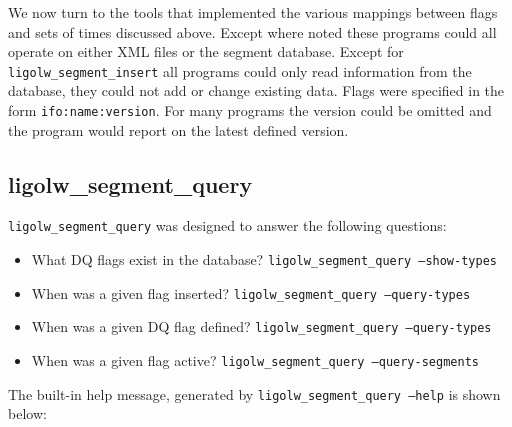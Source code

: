We now turn to the tools that implemented the various mappings between
flags and sets of times discussed above.  Except where noted these
programs could all operate on either XML files or the segment
database.  Except for \texttt{ligolw\_segment\_insert} all programs
could only read information from the database, they could not add or
change existing data.  Flags were specified in the form
\texttt{ifo:name:version}.  For many programs the version could be
omitted and the program would report on the latest defined version.

\subsection{ligolw\_segment\_query}

\texttt{ligolw\_segment\_query} was designed to answer the following
questions:
%
\begin{itemize}
\item What DQ flags exist in the database?
\texttt{ligolw\_segment\_query --show-types}
\item When was a given flag inserted? \texttt{ligolw\_segment\_query
--query-types}
\item When was a given DQ flag defined? \texttt{ligolw\_segment\_query
--query-types}
\item When was a given flag active? \texttt{ligolw\_segment\_query
--query-segments}
\end{itemize}
%
The built-in help message, generated by \texttt{ligolw\_segment\_query
--help} is shown below:
%
